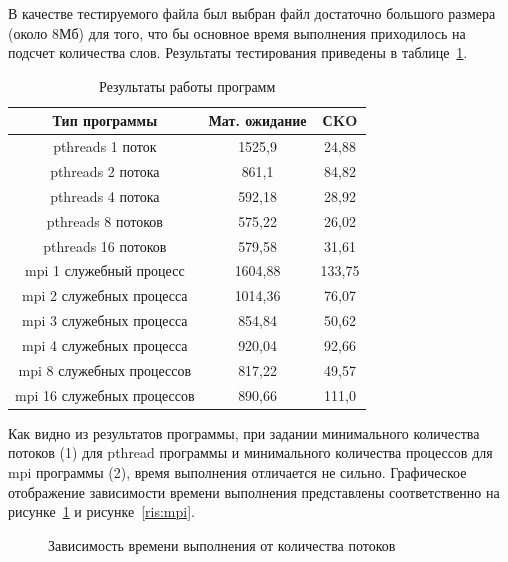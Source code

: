 \documentclass[12pt,a4paper]{report}
\begin{document}
				В качестве тестируемого файла был выбран файл достаточно большого размера (около 
				8Мб) для того, что бы основное время выполнения приходилось на подсчет 
				количества слов. Результаты тестирования приведены в 				
				таблице~\ref{tab:totalTab}.
				\begin{table}[h]
					\caption{\label{tab:totalTab} Результаты работы программ}
					\begin{center}
						\begin{tabular}{|c|c|c|}
							\hline
							\textbf{Тип программы} & \textbf{Мат. ожидание} & \textbf{СKO}\\
							\hline
							pthreads 1 поток & 1525,9 & 24,88 \\
							\hline
							pthreads 2 потока & 861,1 & 84,82 \\
							\hline
							pthreads 4 потока & 592,18 & 28,92 \\
							\hline
							pthreads 8 потоков & 575,22 & 26,02 \\
							\hline
							pthreads 16 потоков & 579,58 & 31,61 \\
							\hline
							mpi 1 служебный процесс & 1604,88 & 133,75 \\
							\hline
							mpi 2 служебных процесса & 1014,36 & 76,07 \\
							\hline
							mpi 3 служебных процесса & 854,84 & 50,62 \\
							\hline
							mpi 4 служебных процесса & 920,04 & 92,66 \\
							\hline
							mpi 8 служебных процессов & 817,22 & 49,57 \\
							\hline
							mpi 16 служебных процессов & 890,66 & 111,0 \\
							\hline
						\end{tabular}
					\end{center}
				\end{table}
				
				Как видно из результатов программы, при задании минимального количества 
				потоков (1) для pthread программы и минимального количества процессов 
				для mpi программы (2), время выполнения отличается не сильно. Графическое 
				отображение зависимости времени выполнения представлены соответственно на рисунке~\ref{ris:threads} и рисунке~\ref{ris:mpi}.
				
				\begin{figure}[h]
					\caption{Зависимость времени выполнения от количества потоков}
					\label{ris:threads}
				\end{figure}
				
\end{document}
